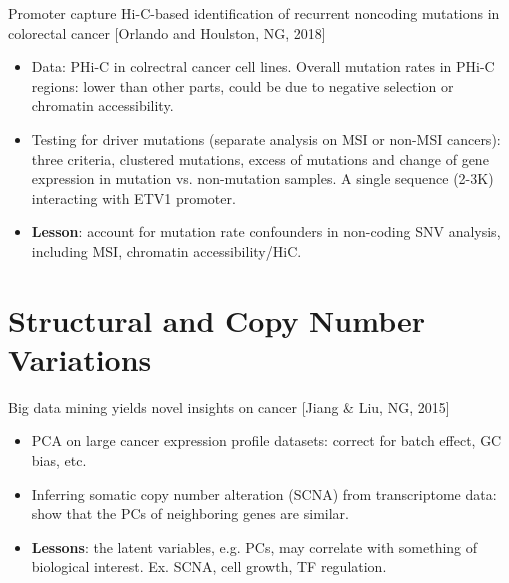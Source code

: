 \documentclass{report}
\begin{document}
Promoter capture Hi-C-based identification of recurrent noncoding mutations in colorectal cancer [Orlando and Houlston, NG, 2018]
\begin{itemize}
	
	\item Data: PHi-C in colrectral cancer cell lines. Overall mutation rates in PHi-C regions: lower than other parts, could be due to negative selection or chromatin accessibility. 
	
	\item Testing for driver mutations (separate analysis on MSI or non-MSI cancers): three criteria, clustered mutations, excess of mutations and change of gene expression in mutation vs. non-mutation samples. A single sequence (2-3K) interacting with ETV1 promoter. 
	
	\item \textbf{Lesson}: account for mutation rate confounders in non-coding SNV analysis, including MSI, chromatin accessibility/HiC.  
\end{itemize}

\section{Structural and Copy Number Variations}

Big data mining yields novel insights on cancer [Jiang \& Liu, NG, 2015]
\begin{itemize}
	\item PCA on large cancer expression profile datasets: correct for batch effect, GC bias, etc. 
	
	\item Inferring somatic copy number alteration (SCNA) from transcriptome data: show that the PCs of neighboring genes are similar. 
	
	\item \textbf{Lessons}: the latent variables, e.g. PCs, may correlate with something of biological interest. Ex. SCNA, cell growth, TF regulation. 
\end{itemize}
\end{document}
